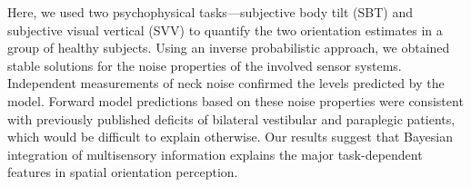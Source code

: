 Here, we used two psychophysical tasks---subjective body tilt (SBT) and subjective visual vertical (SVV) to quantify the two orientation estimates in a group of healthy subjects. Using an inverse probabilistic approach, we obtained stable solutions for the noise properties of the involved sensor systems. Independent measurements of neck noise confirmed the levels predicted by the model. Forward model predictions based on these noise properties were consistent with previously published deficits of bilateral vestibular and paraplegic patients, which would be difficult to explain otherwise. Our results suggest that Bayesian integration of multisensory information explains the major task-dependent features in spatial orientation perception. 
